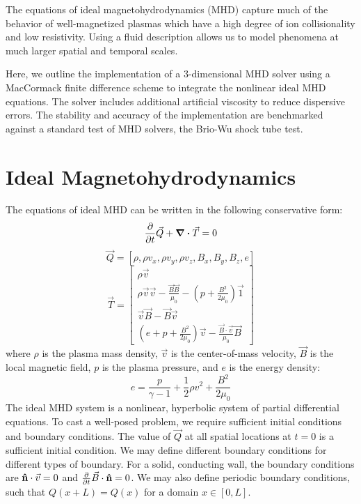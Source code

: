 \documentclass[%
 reprint,
 amsmath,amssymb,
 aps,
]{revtex4-2}
\begin{document}
The equations of ideal magnetohydrodynamics (MHD) capture much of the behavior of well-magnetized plasmas which have a high degree of ion collisionality and low resistivity. Using a fluid description allows us to model phenomena at much larger spatial and temporal scales.

Here, we outline the implementation of a 3-dimensional MHD solver using a MacCormack finite difference scheme to integrate the nonlinear ideal MHD equations. The solver includes additional artificial viscosity to reduce dispersive errors. The stability and accuracy of the implementation are benchmarked against a standard test of MHD solvers, the Brio-Wu shock tube test.

\section{Ideal Magnetohydrodynamics}
The equations of ideal MHD can be written in the following conservative form:
\begin{equation}
\pdv{}{t}\vec Q + \div \vec T = 0 
\end{equation}
\begin{equation}
\vec Q = [\rho, \rho v_x, \rho v_y, \rho v_z, B_x, B_y, B_z, e]
\end{equation}
\begin{equation}
\vec T = \begin{bmatrix}
\rho \vec v \\
\rho \vec v \vec v - \frac{\vec B \vec B}{\mu_0} - \left( p + \frac{B^2}{2 \mu_0} \right) \vec{1} \\
\vec v \vec B - \vec B \vec v \\
\left( e + p + \frac{B^2}{2 \mu_0} \right) \vec v - \frac{\vec B \cdot \vec v}{\mu_0} \vec B
\end{bmatrix}
\end{equation}
where $\rho$ is the plasma mass density, $\vec v$ is the center-of-mass velocity, $\vec B$ is the local magnetic field, $p$ is the plasma pressure, and $e$ is the energy density:
\begin{equation}
e = \frac{p}{\gamma - 1} + \frac{1}{2} \rho v^2 + \frac{B^2}{2 \mu_0}
\end{equation}
The ideal MHD system is a nonlinear, hyperbolic system of partial differential equations. To cast a well-posed problem, we require sufficient initial conditions and boundary conditions. The value of $\vec Q$ at all spatial locations at $t = 0$ is a sufficient initial condition. We may define different boundary conditions for different types of boundary. For a solid, conducting wall, the boundary conditions are $\vu n \cdot \vec v = 0$ and $\pdv{}{t} \vec B \cdot \vu n = 0$. We may also define periodic boundary conditions, such that $Q(x + L) = Q(x)$ for a domain $x \in [0, L]$.
\end{document}
